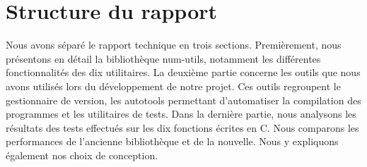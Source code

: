 \section{Structure du rapport}

Nous avons s\'epar\'e le rapport technique en trois sections.
\newline
Premi\`erement, nous pr\'esentons en d\'etail la biblioth\`eque num-utils, notamment les diff\'erentes fonctionnalit\'es des dix utilitaires.
\newline
La deuxi\`eme partie concerne les outils que nous avons utilis\'es lors du d\'eveloppement de notre projet. Ces outils regroupent le gestionnaire de version, les autotools permettant d'automatiser la compilation des programmes et les utilitaires de tests. 
\newline
Dans la derni\`ere partie, nous analysons les r\'esultats des tests effectu\'es sur les dix fonctions \'ecrites en C. Nous comparons les performances de l'ancienne biblioth\`eque et de la nouvelle. Nous y expliquons \'egalement nos choix de conception.
